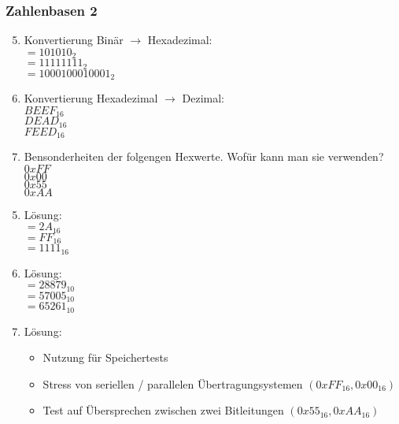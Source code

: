 \begin{frame}
    \frametitle{Zahlenbasen 2}  
    \vspace{0.5cm}

    \begin{multicols}{2}
        \begin{enumerate}
            \setcounter{enumi}{4}
            \item Konvertierung Binär \( \rightarrow \) Hexadezimal: \\
                \( = 101010_{2} \) \\
                \( = 11111111_{2} \) \\
                \( = 1000100010001_{2} \)
            \item Konvertierung Hexadezimal \( \rightarrow \) Dezimal: \\
                \( BEEF_{16} \) \\
                \( DEAD_{16} \) \\
                \( FEED_{16} \) \\
            \item Bensonderheiten der folgengen Hexwerte. Wofür kann man sie verwenden? \\
                \( 0xFF \) \\
                \( 0x00 \) \\
                \( 0x55 \) \\
                \( 0xAA \) \\
        \end{enumerate}
        \vfill\columnbreak
        \pause

        \begin{enumerate}
            \setcounter{enumi}{4}
            \item Lösung: \\
                \( = 2A_{16} \) \\
                \( = FF_{16} \) \\
                \( = 1111_{16} \)
            \item Lösung: \\
                \( = 28879_{10} \) \\
                \( = 57005_{10} \) \\
                \( = 65261_{10} \) \\
            \item Lösung: \\
                \begin{itemize}
                    \item Nutzung für Speichertests
                    \item Stress von seriellen / parallelen Übertragungsystemen \( ( 0xFF_{16}, 0x00_{16} ) \)
                    \item Test auf Übersprechen zwischen zwei Bitleitungen \( ( 0x55_{16}, 0xAA_{16} ) \)
                \end{itemize}
        \end{enumerate}
    \end{multicols}
\end{frame}

